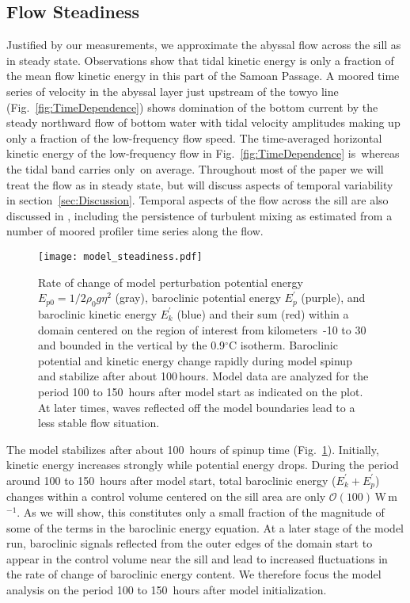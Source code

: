 \documentclass{ametsocV6.1}
\begin{document}
\subsection{Flow Steadiness}\label{ssec:FlowSteadiness}
Justified by our measurements, we approximate the abyssal flow across the sill as in steady state.
Observations show that tidal kinetic energy is only a fraction of the mean flow kinetic energy in this part of the Samoan Passage.
A moored time series of velocity in the abyssal layer just upstream of the towyo line (Fig.~\ref{fig:TimeDependence}) shows domination of the bottom current by the steady northward flow of bottom water with tidal velocity amplitudes making up only a fraction of the low-frequency flow speed.
The time-averaged horizontal kinetic energy of the low-frequency flow in Fig.~\ref{fig:TimeDependence} is \MPLowFreqKE\,\MPLowFreqKEUnit whereas the tidal band carries only \MPTidalFreqKE\,\MPTidalFreqKEUnit on average.
Throughout most of the paper we will treat the flow as in steady state, but will discuss aspects of temporal variability in section~\ref{sec:Discussion}.
Temporal aspects of the flow across the sill are also discussed in \citet{cusacketal19}, including the persistence of turbulent mixing as estimated from a number of moored profiler time series along the flow. 

\begin{figure}
\centerline{\texttt{[image: model\_steadiness.pdf]}}
\caption{
Rate of change of model perturbation potential energy $E_{p0}=1/2 \rho_0 g \eta^2$ (gray), baroclinic potential energy $E_p^\prime$ (purple), and baroclinic kinetic energy $E_k^\prime$ (blue) and their sum (red) within a domain centered on the region of interest from kilometers~-10 to 30 and bounded in the vertical by the 0.9$^{\circ}$C isotherm.
Baroclinic potential and kinetic energy change rapidly during model spinup and stabilize after about 100\,hours.
Model data are analyzed for the period 100 to 150~hours after model start as indicated on the plot.
At later times, waves reflected off the model boundaries lead to a less stable flow situation.
}
\label{fig:ModelSteadiness}
\end{figure}

The model stabilizes after about 100~hours of spinup time (Fig.~\ref{fig:ModelSteadiness}).
Initially, kinetic energy increases strongly while potential energy drops.
During the period around 100 to 150~hours after model start, total baroclinic energy ($E_k^\prime + E_p^\prime$) changes within a control volume centered on the sill area are only $\mathcal{O}(100)$\,W\,m$^{-1}$.
As we will show, this constitutes only a small fraction of the magnitude of some of the terms in the baroclinic energy equation.
At a later stage of the model run, baroclinic signals reflected from the outer edges of the domain start to appear in the control volume near the sill and lead to increased fluctuations in the rate of change of baroclinic energy content.
We therefore focus the model analysis on the period 100 to 150~hours after model initialization.
\end{document}
